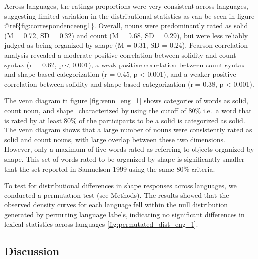 \documentclass[
  english,
  man]{apa6}
\begin{document}
Across languages, the ratings proportions were very consistent across languages, suggesting limited variation in the distributional statistics as can be seen in figure @ref\{fig:correspondenceeng1\}. Overall, nouns were predominantly rated as solid (M = 0.72, SD = 0.32) and count (M = 0.68, SD = 0.29), but were less reliably judged as being organized by shape (M = 0.31, SD = 0.24). Pearson correlation analysis revealed a moderate positive correlation between solidity and count syntax (r = 0.62, p \textless{} 0.001), a weak positive correlation between count syntax and shape-based categorization (r = 0.45, p \textless{} 0.001), and a weaker positive correlation between solidity and shape-based categorization (r = 0.38, p \textless{} 0.001).

The venn diagram in figure \ref{fig:venn_eng_1} shows categories of words as solid, count noun, and shape\_characterized by using the cutoff of 80\% i.e.~a word that is rated by at least 80\% of the participants to be a solid is categorized as solid. The venn diagram shows that a large number of nouns were consistently rated as solid and count nouns, with large overlap between these two dimensions. However, only a maximum of five words rated as referring to objects organized by shape. This set of words rated to be organized by shape is significantly smaller that the set reported in Samuelson 1999 using the same 80\% criteria.

To test for distributional differences in shape responses across languages, we conducted a permutation test (see Methods). The results showed that the observed density curves for each language fell within the null distribution generated by permuting language labels, indicating no significant differences in lexical statistics across languages \ref{fig:permutated_dist_eng_1}.

\subsection{Discussion}\label{discussion}
\end{document}
